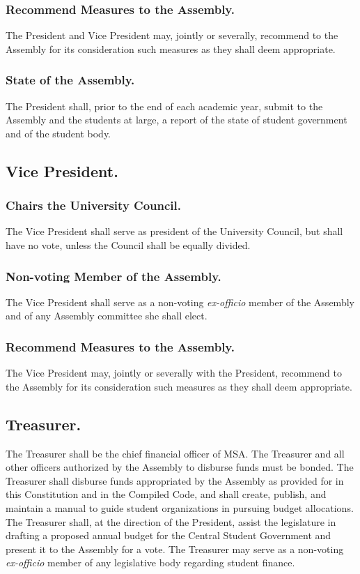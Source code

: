\subsubsection{Recommend Measures to the Assembly.}
The President and Vice President may, jointly or severally, recommend to the Assembly for its consideration such measures as they shall deem appropriate.

\subsubsection{State of the Assembly.}
The President shall, prior to the end of each academic year, submit to the Assembly and the students at large, a report of the state of student government and of the student body.


\subsection{Vice President.}
\subsubsection{Chairs the University Council.}
The Vice President shall serve as president of the University Council, but shall have no vote, unless the Council shall be equally divided.

\subsubsection{Non-voting Member of the Assembly.}
The Vice President shall serve as a non-voting \textit{ex-officio} member of the Assembly and of any Assembly committee she shall elect.

\subsubsection{Recommend Measures to the Assembly.}
The Vice President may, jointly or severally with the President, recommend to the Assembly for its consideration such measures as they shall deem appropriate.


\subsection{Treasurer.}
The Treasurer shall be the chief financial officer of MSA. The Treasurer and all other officers authorized by the Assembly to disburse funds must be bonded. The Treasurer shall disburse funds appropriated by the Assembly as provided for in this Constitution and in the Compiled Code, and shall create, publish, and maintain a manual to guide student organizations in pursuing budget allocations. The Treasurer shall, at the direction of the President, assist the legislature in drafting a proposed annual budget for the Central Student Government and present it to the Assembly for a vote. The Treasurer may serve as a non-voting \textit{ex-officio} member of any legislative body regarding student finance.

